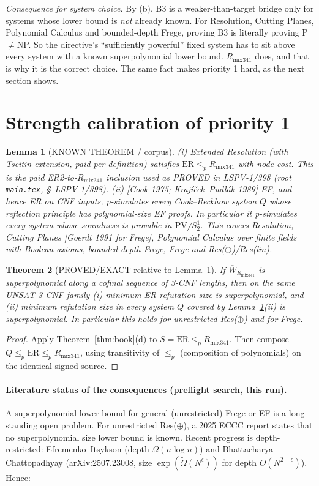 \documentclass[11pt]{article}
\newtheorem{theorem}{Theorem}
\newtheorem{lemma}[theorem]{Lemma}
\theoremstyle{definition}
\newcommand{\Wb}{\overline W}
\newcommand{\Rm}{R_{\mathrm{mix341}}}
\begin{document}
\emph{Consequence for system choice.} By (b), B3 is a weaker-than-target
bridge only for systems whose lower bound is \emph{not} already known. For
Resolution, Cutting Planes, Polynomial Calculus and bounded-depth Frege,
proving B3 is literally proving P$\ne$NP. So the directive's ``sufficiently
powerful'' fixed system has to sit above every system with a known
superpolynomial lower bound. $\Rm$ does, and that is why it is the correct
choice. The same fact makes priority 1 hard, as the next section shows.

\section{Strength calibration of priority 1}
\begin{lemma}[KNOWN THEOREM / corpus]\label{lem:incl}
(i) Extended Resolution (with Tseitin extension, paid per definition) satisfies
$\mathrm{ER}\le_p\Rm$ with node cost. This is the paid ER2-to-$\Rm$ inclusion
used as PROVED in LSPV-1/398 (root \texttt{main.tex}, \S\ LSPV-1/398).
(ii) [Cook 1975; Krajíček--Pudlák 1989] EF, and hence ER on CNF inputs,
p-simulates every Cook--Reckhow system $Q$ whose reflection principle has
polynomial-size EF proofs. In particular it p-simulates every system whose
soundness is provable in $\mathrm{PV}$/$S^1_2$. This covers Resolution, Cutting
Planes [Goerdt 1991 for Frege], Polynomial Calculus over finite fields with
Boolean axioms, bounded-depth Frege, Frege and Res($\oplus$)/Res(lin).
\end{lemma}

\begin{theorem}[PROVED/EXACT relative to Lemma~\ref{lem:incl}]\label{thm:cal}
If $\Wb_{\Rm}$ is superpolynomial along a cofinal sequence of 3-CNF lengths,
then on the same UNSAT 3-CNF family (i) minimum ER refutation size is
superpolynomial, and (ii) minimum refutation size in every system $Q$
covered by Lemma~\ref{lem:incl}(ii) is superpolynomial. In particular this
holds for unrestricted Res($\oplus$) and for Frege.
\end{theorem}
\begin{proof}
Apply Theorem~\ref{thm:book}(d) to $S=\mathrm{ER}\le_p\Rm$. Then compose
$Q\le_p\mathrm{ER}\le_p\Rm$, using transitivity of $\le_p$ (composition of
polynomials) on the identical signed source.
\end{proof}

\paragraph{Literature status of the consequences (preflight search, this run).}
A superpolynomial lower bound for general (unrestricted) Frege or EF is a
long-standing open problem. For unrestricted Res($\oplus$), a 2025 ECCC report
states that no superpolynomial size lower bound is known. Recent progress
is depth-restricted: Efremenko--Itsykson (depth $\Omega(n\log n)$) and
Bhattacharya--Chattopadhyay (arXiv:2507.23008, size
$\exp(\tilde\Omega(N^{\epsilon}))$ for depth $O(N^{2-\epsilon})$). Hence:
\end{document}
